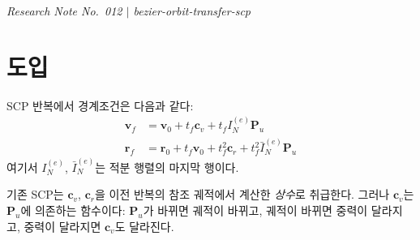 \documentclass[11pt]{article}
\begin{document}
\drawborder
\thispagestyle{firstpage}


{\normalsize\textit{Research Note No.~012 $|$ bezier-orbit-transfer-scp}}\par\medskip

\def\lighterdate{March 29, 2026}


\begin{abstract}
SCP 경계조건에서 드리프트 적분 $\mathbf{c}_v$를 상수로 취급하면
제어점 $\mathbf{P}_u$ 변화에 대한 중력 되먹임이 무시되어
수렴이 느려진다.
본 보고서는 Bernstein 대수 파이프라인의 각 단계를
미분하여 커플링 행렬 $M_v = \partial\mathbf{c}_v / \partial\text{vec}(\mathbf{P}_u)$를
해석적으로 구성하는 이론을 제시한다.
핵심 관찰은, 모든 단계의 Jacobian이 Bernstein 곱
\texttt{bern\_product}의 가중치 행렬 $W$로 표현된다는 점이다.
따라서 단일 빌딩블록 \texttt{bern\_product\_with\_jacobian}만 구현하면
체인 룰로 전체 감도를 조립할 수 있다.
JAX 자동 미분으로 이론을 검증하고,
순수 numpy 구현의 해석적 Jacobian과 비교한다.
\end{abstract}

\section{도입}

SCP 반복에서 경계조건은 다음과 같다\cite{report006}:
\begin{align}
  \mathbf{v}_f &= \mathbf{v}_0 + t_f \mathbf{c}_v + t_f I_N^{(e)} \mathbf{P}_u
  \label{eq:bc_v} \\
  \mathbf{r}_f &= \mathbf{r}_0 + t_f \mathbf{v}_0
    + t_f^2 \mathbf{c}_r + t_f^2 \bar{I}_N^{(e)} \mathbf{P}_u
  \label{eq:bc_r}
\end{align}
여기서 $I_N^{(e)}$, $\bar{I}_N^{(e)}$는 적분 행렬의 마지막 행이다.

기존 SCP는 $\mathbf{c}_v$, $\mathbf{c}_r$을 이전 반복의
참조 궤적에서 계산한 \emph{상수}로 취급한다.
그러나 $\mathbf{c}_v$는 $\mathbf{P}_u$에 의존하는 함수이다:
$\mathbf{P}_u$가 바뀌면 궤적이 바뀌고,
궤적이 바뀌면 중력이 달라지고,
중력이 달라지면 $\mathbf{c}_v$도 달라진다.
\end{document}
